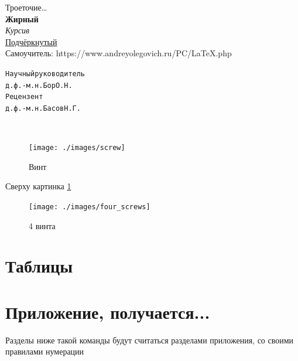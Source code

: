 Троеточие\ldots\\
\textbf{Жирный}\\
\textit{Курсив}\\
\underline{Подчёркнутый}\\
Самоучитель: https://www.andreyolegovich.ru/PC/LaTeX.php

\begin{alltt}
  Научный руководитель
  д.ф.-м.н. Бор О.Н.
  Рецензент
  д.ф.-м.н. Басов Н.Г.
\end{alltt}

\lipsum[3]\\
\lipsum[2]

\begin{figure}[h!]
  \centering
  \texttt{[image: ./images/screw]}
  \caption{Винт}
  \label{figure:screw}
\end{figure}

\clearpage %

Сверху картинка \ref{figure:screw}

\begin{figure}[h!]
  \centering
  \texttt{[image: ./images/four\_screws]}
  \caption{4 винта}
  \label{figure:four_screws}
\end{figure}


\section{Таблицы}

\thispagestyle{empty}

\appendix
\section{Приложение, получается...}
Разделы ниже такой команды будут считаться разделами приложения, со своими
правилами нумерации



